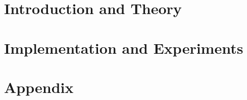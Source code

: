\documentclass[11pt,a4paper,biblography=totoc,index=totoc,headsepline,footsepline,footinlcude=false,BCOR12mm,DIV13]{scrbook}
\begin{document}
 \frontmatter



%
%	


%	

 

 

 

 


 \tableofcontents

 

 \mainmatter


	 \part[Introduction and Theory]{Introduction and Theory}
	 \label{part:introAndBackgroundTheory}
	 
	 


	 \part[Implementation and Experiments]{Implementation and Experiments}
   
	 \label{part:secondP}



	 \part*{Appendix}

	 \appendix %

	 




 \clearemptydoublepage

 \printglossaries



 
\end{document}
